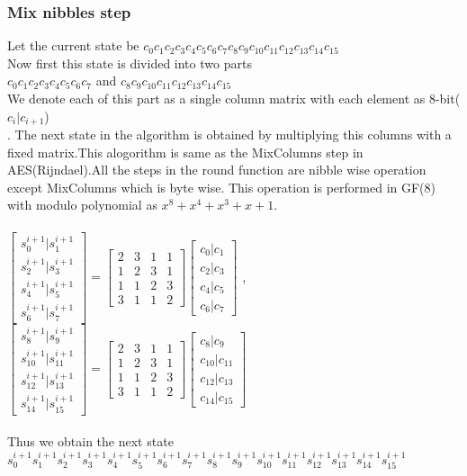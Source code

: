 \documentclass[preprint]{transcrypto}
\begin{document}
\subsubsection{Mix nibbles step}
Let the current state be $c_{0} c_{1} c_{2} c_{3} c_{4} c_{5} c_{6} c_{7} c_{8} c_{9} c_{10} c_{11} c_{12} c_{13} c_{14} c_{15}$\\
Now first this state is divided into two parts \\
$ c_{0} c_{1} c_{2} c_{3} c_{4} c_{5} c_{6} c_{7} $ and $c_{8} c_{9} c_{10} c_{11} c_{12} c_{13} c_{14} c_{15}$ \\
We denote each of this part as a single column matrix with each element as 8-bit($c_{i}|c_{i+1}$) \\. The next state in the algorithm is obtained by multiplying this columns with a fixed matrix.This alogorithm is same as the MixColumns step in AES(Rijndael).All the steps in the round function are nibble wise operation except MixColumns which is byte wise. This operation is performed in GF(8) with modulo polynomial as $x^{8} + x^{4} + x^{3} + x + 1$.\\ \\
$\begin{bmatrix}
s^{i+1}_{0} | s^{i+1}_{1}\\
s^{i+1}_{2} | s^{i+1}_{3}\\
s^{i+1}_{4} | s^{i+1}_{5}\\
s^{i+1}_{6} | s^{i+1}_{7}
\end{bmatrix}=
\begin{bmatrix}
2&3&1&1\\
1&2&3&1\\
1&1&2&3\\
3&1&1&2
\end{bmatrix}
\begin{bmatrix}
c_{0}|c_{1}\\
c_{2}|c_{3}\\
c_{4}|c_{5}\\
c_{6}|c_{7}
\end{bmatrix}  $ ,
$\begin{bmatrix}
s^{i+1}_{8} | s^{i+1}_{9}\\
s^{i+1}_{10} | s^{i+1}_{11}\\
s^{i+1}_{12} | s^{i+1}_{13}\\
s^{i+1}_{14} | s^{i+1}_{15}
\end{bmatrix}=
\begin{bmatrix}
2&3&1&1\\
1&2&3&1\\
1&1&2&3\\
3&1&1&2
\end{bmatrix}
\begin{bmatrix}
c_{8}|c_{9}\\
c_{10}|c_{11}\\
c_{12}|c_{13}\\
c_{14}|c_{15}
\end{bmatrix}  $\\ \\
Thus we obtain the next state 
$ s^{i+1}_{0}  s^{i+1}_{1}
s^{i+1}_{2}  s^{i+1}_{3}
s^{i+1}_{4}  s^{i+1}_{5}
s^{i+1}_{6}  s^{i+1}_{7}
s^{i+1}_{8}  s^{i+1}_{9}
s^{i+1}_{10}  s^{i+1}_{11}
s^{i+1}_{12}  s^{i+1}_{13}
s^{i+1}_{14}  s^{i+1}_{15} $
\end{document}
